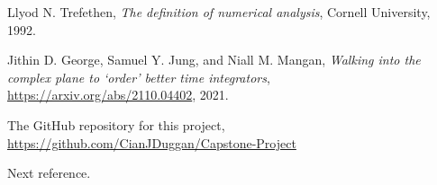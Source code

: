 \providecommand{\bysame}{\leavevmode\hbox to3em{\hrulefill}\thinspace}
\providecommand{\href}[2]{#2}
\begin{thebibliography}{1}

Llyod N. Trefethen, \emph{{T}he definition of numerical analysis}, Cornell University, 1992.

Jithin D. George, Samuel Y. Jung, and Niall M. Mangan, \emph{{W}alking into the complex plane to `order' better time integrators}, \url{https://arxiv.org/abs/2110.04402}, 2021.

The GitHub repository for this project, \url{https://github.com/CianJDuggan/Capstone-Project}

Next reference.

\end{thebibliography}
